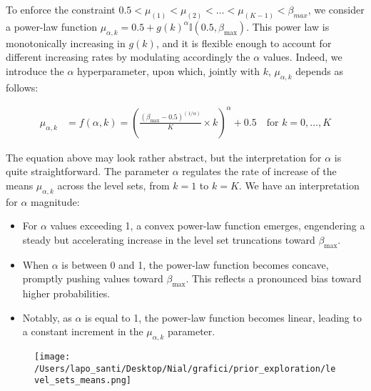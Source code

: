 \documentclass[11pt]{amsart}
\begin{document}
To enforce the constraint $0.5 < \mu_{(1)} < \mu_{(2)} < \ldots < \mu_{(K-1)}< \beta_{max}$, we consider a power-law function $\mu_{\alpha,k} = 0.5 + g(k)^\alpha \mathbb{I}\left(0.5,\beta_{\max}\right)$. This power law is monotonically increasing in $g(k)$, and it is flexible enough to account for different increasing rates by modulating accordingly the $\alpha$ values. Indeed, we introduce the $\alpha$ hyperparameter, upon which, jointly with $k$, $\mu_{\alpha,k}$ depends as follows:

\begin{align}
\mu_{\alpha,k} &= f(\alpha, k) = \left( \frac{(\beta_{\max} - 0.5)^{(1/\alpha)}}{K} \times k \right)^\alpha + 0.5 \quad \text{for } k = 0, \ldots, K
\end{align}

The equation above may look rather abstract, but the interpretation for $\alpha$ is quite straightforward. The parameter $\alpha$ regulates the rate of increase of the means $\mu_{\alpha,k}$ across the level sets, from $k=1$ to $k=K$. We have an interpretation for \(\alpha\) magnitude:
\begin{itemize}
    \item For \(\alpha\) values exceeding 1, a convex power-law function emerges, engendering a steady but accelerating increase in the level set truncations toward \(\beta_{\max}\).
    
    \item When \(\alpha\) is between 0 and 1, the power-law function becomes concave, promptly pushing values toward \(\beta_{\max}\). This reflects a pronounced bias toward higher probabilities.
    
    \item Notably, as \(\alpha\) is equal to 1, the power-law function becomes linear, leading to a constant increment in the $\mu_{\alpha,k}$ parameter.
\end{itemize}

\begin{figure}
\begin{center}
\texttt{[image: /Users/lapo\_santi/Desktop/Nial/grafici/prior\_exploration/level\_sets\_means.png]}
\caption{ }
\label{ }
\end{center}
\end{figure}

\vspace{.5cm}
\end{document}
